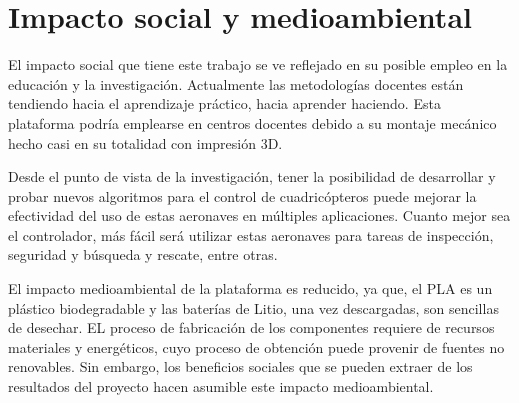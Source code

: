 \chapter{Impacto social y medioambiental}

El impacto social que tiene este trabajo se ve reflejado en su posible empleo en la educación y la investigación. Actualmente las metodologías docentes están tendiendo hacia el aprendizaje práctico, hacia aprender haciendo. Esta plataforma podría emplearse en centros docentes debido a su montaje mecánico hecho casi en su totalidad con impresión 3D.

Desde el punto de vista de la investigación, tener la posibilidad de desarrollar y probar nuevos algoritmos para el control de cuadricópteros puede mejorar la efectividad del uso de estas aeronaves en múltiples aplicaciones. Cuanto mejor sea el controlador, más fácil será utilizar estas aeronaves para tareas de inspección, seguridad y búsqueda y rescate, entre otras.

El impacto medioambiental de la plataforma es reducido, ya que, el PLA es un plástico biodegradable y las baterías de Litio, una vez descargadas, son sencillas de desechar. EL proceso de fabricación de los componentes requiere de recursos materiales y energéticos, cuyo proceso de obtención  puede provenir de fuentes no renovables. Sin embargo, los beneficios sociales que se pueden extraer de los resultados del proyecto hacen asumible este impacto medioambiental.


